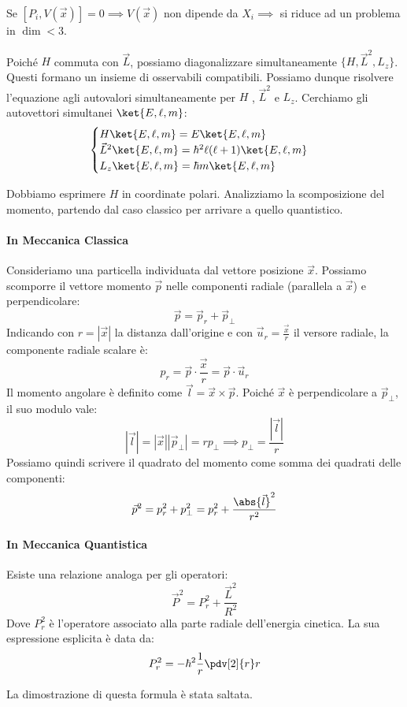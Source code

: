 \begin{remark}
    Se \([P_i, V(\vec{x})] = 0 \implies V(\vec{x})\) non dipende da \( X_i \implies \) si riduce ad un problema in \(\dim < 3\).
\end{remark}

Poiché \( H \) commuta con \( \vec{L} \), possiamo diagonalizzare simultaneamente \( \{H, \vec{L}^2, L_z\} \). Questi formano un insieme di osservabili compatibili.
Possiamo dunque risolvere l'equazione agli autovalori simultaneamente per \( H \) , \( \vec{L}^2 \) e \(L_z\). Cerchiamo gli autovettori simultanei \( \ket{E, \ell, m} \):
\begin{equation}
    \label{eq: potCentrali}
    \begin{cases}
        H\ket{E,\ell,m} = E\ket{E,\ell,m} \\
        \vec{L}^2\ket{E,\ell,m} = \hbar^2 \ell(\ell+1)\ket{E,\ell,m} \\
        L_z\ket{E,\ell,m} = \hbar m\ket{E,\ell,m}
    \end{cases}
\end{equation}

Dobbiamo esprimere \( H \) in coordinate polari. Analizziamo la scomposizione del momento, partendo dal caso classico per arrivare a quello quantistico.
\paragraph{In Meccanica Classica}
Consideriamo una particella individuata dal vettore posizione \( \vec{x} \). Possiamo scomporre il vettore momento \( \vec{p} \) nelle componenti radiale (parallela a \( \vec{x} \)) e perpendicolare:
\[
\vec{p} = \vec{p}_r + \vec{p}_\perp
\]
Indicando con \( r = |\vec{x}| \) la distanza dall'origine e con \( \vec{u}_r = \frac{\vec{x}}{r} \) il versore radiale, la componente radiale scalare è:
\[
p_r = \vec{p} \cdot \frac{\vec{x}}{r} = \vec{p} \cdot \vec{u}_r
\]
Il momento angolare è definito come \( \vec{l} = \vec{x} \times \vec{p} \). Poiché \( \vec{x} \) è perpendicolare a \( \vec{p}_\perp \), il suo modulo vale:
\[
|\vec{l}| = |\vec{x}| |\vec{p}_\perp| = r p_\perp \implies p_\perp = \frac{|\vec{l}|}{r}
\]
Possiamo quindi scrivere il quadrato del momento come somma dei quadrati delle componenti:
\[
\vec{p}^2 = p_r^2 + p_\perp^2 = p_r^2 + \frac{\abs{\vec{l}}^2}{r^2}
\]

\paragraph{In Meccanica Quantistica}
Esiste una relazione analoga per gli operatori:
\begin{equation}
    \vec{P}^2 = P_r^2 + \frac{\vec{L}^2}{R^2}
\end{equation}
Dove \( P_r^2 \) è l'operatore associato alla parte radiale dell'energia cinetica. La sua espressione esplicita è data da:
\begin{equation*}
    P_r^2 = -\hbar^2 \frac{1}{r} \pdv[2]{r} r
\end{equation*}
\begin{attention}
    La dimostrazione di questa formula è stata saltata.
\end{attention}


